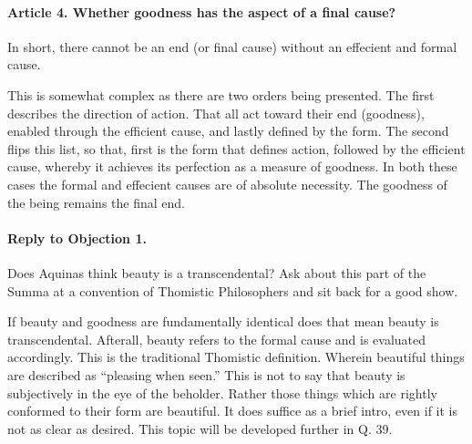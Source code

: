 \documentclass{ucetd}
\begin{document}
\paragraph{Article 4. Whether goodness has the aspect of a final cause?}
In short, there cannot be an end (or final cause) without an effecient and formal cause.

This is somewhat complex as there are two orders being presented. The first describes the direction of action. That all act toward their end (goodness), enabled through the efficient cause, and lastly defined by the form. The second flips this list, so that, first is the form that defines action, followed by the efficient cause, whereby it achieves its perfection as a measure of goodness. In both these cases the formal and effecient causes are of absolute necessity. The goodness of the being remains the final end.
\paragraph{Reply to Objection 1.}
Does Aquinas think beauty is a transcendental? Ask about this part of the Summa at a convention of Thomistic Philosophers and sit back for a good show. 

If beauty and goodness are fundamentally identical does that mean beauty is transcendental. Afterall, beauty refers to the formal cause and is evaluated accordingly. This is the traditional Thomistic definition. Wherein beautiful things are described as ``pleasing when seen.'' This is not to say that beauty is subjectively in the eye of the beholder. Rather those things which are rightly conformed to their form are beautiful. It does suffice as a brief intro, even if it is not as clear as desired. This topic will be developed further in Q. 39.
\end{document}
